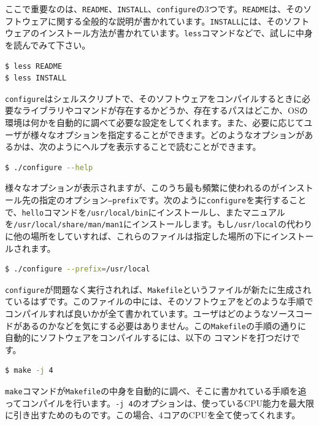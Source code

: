 ここで重要なのは、\texttt{README}、\texttt{INSTALL}、\texttt{configure}の3つです。\texttt{README}は、そのソフトウェアに関する全般的な説明が書かれています。\texttt{INSTALL}には、そのソフトウェアのインストール方法が書かれています。\texttt{less}コマンドなどで、試しに中身を読んでみて下さい。

\begin{lstlisting}[language=bash]
$ less README
$ less INSTALL
\end{lstlisting}

\texttt{configure}はシェルスクリプトで、そのソフトウェアをコンパイルするときに必要なライブラリやコマンドが存在するかどうか、存在するパスはどこか、OSの環境は何かを自動的に調べて必要な設定をしてくれます。また、必要に応じてユーザが様々なオプションを指定することができます。どのようなオプションがあるかは、次のようにヘルプを表示することで読むことができます。

\begin{lstlisting}[language=bash]
$ ./configure --help
\end{lstlisting}

様々なオプションが表示されますが、このうち最も頻繁に使われるのがインストール先の指定のオプション\texttt{--prefix}です。次のように\texttt{configure}を実行することで、\texttt{hello}コマンドを\texttt{/usr/local/bin}にインストールし、またマニュアルを\texttt{/usr/local/share/man/man1}にインストールします。もし\texttt{/usr/local}の代わりに他の場所をしていすれば、これらのファイルは指定した場所の下にインストールされます。
\begin{lstlisting}[language=bash]
$ ./configure --prefix=/usr/local
\end{lstlisting} 

\texttt{configure}が問題なく実行されれば、\texttt{Makefile}というファイルが新たに生成されているはずです。このファイルの中には、そのソフトウェアをどのような手順でコンパイルすれば良いかが全て書かれています。ユーザはどのようなソースコードがあるのかなどを気にする必要はありません。この\texttt{Makefile}の手順の通りに自動的にソフトウェアをコンパイルするには、以下の
コマンドを打つだけです。

\begin{lstlisting}[language=bash]
$ make -j 4
\end{lstlisting} 

\texttt{make}コマンドが\texttt{Makefile}の中身を自動的に調べ、そこに書かれている手順を追ってコンパイルを行います。\texttt{-j 4}のオプションは、使っているCPU能力を最大限に引き出すためのものです。この場合、4コアのCPUを全て使ってくれます。

